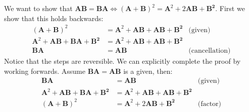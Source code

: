 \begin{sol}
We want to show that $\bm{AB}=\bm{BA} \iff (\bm{A}+\bm{B})^2 = \bm{A}^2+2\bm{AB}+\bm{B^2}$. First we show that this holds backwards:
\begin{align}
    (\bm{A}+\bm{B})^2 &=     \bm{A}^2+\bm{AB}+\bm{AB}+\bm{B^2} & \text{(given)} \\ 
    \bm{A}^2+\bm{AB}+\bm{BA}+\bm{B^2} &= \bm{A}^2+\bm{AB}+\bm{AB}+\bm{B^2} \\
    \bm{BA} &= \bm{AB} & \text{(cancellation)}
\end{align}
Notice that the steps are reversible. We can explicitly complete the proof by working forwards. Assume $\bm{BA}=\bm{AB}$ is a given, then:
\begin{align}
    \bm{BA} &= \bm{AB} & \text{(given)} \\ 
    \bm{A}^2+\bm{AB}+\bm{BA}+\bm{B^2} &= \bm{A}^2+\bm{AB}+\bm{AB}+\bm{B^2} \\ 
    (\bm{A}+\bm{B})^2 &=     \bm{A}^2+2\bm{AB} +\bm{B^2} & \text{(factor)} 
\end{align}
\end{sol}